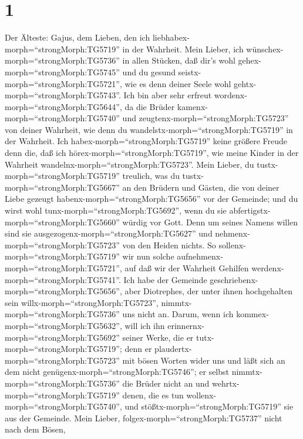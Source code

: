 \hypertarget{section}{%
\section{1}\label{section}}

 Der Älteste: Gajus, dem Lieben, den ich
liebhabex-morph=``strongMorph:TG5719'' in der Wahrheit. 
Mein Lieber, ich wünschex-morph=``strongMorph:TG5736'' in allen Stücken,
daß dir's wohl gehex-morph=``strongMorph:TG5745'' und du gesund
seistx-morph=``strongMorph:TG5721'', wie es denn deiner Seele wohl
gehtx-morph=``strongMorph:TG5743''.  Ich bin aber sehr
erfreut wordenx-morph=``strongMorph:TG5644'', da die Brüder
kamenx-morph=``strongMorph:TG5740'' und
zeugtenx-morph=``strongMorph:TG5723'' von deiner Wahrheit, wie denn du
wandelstx-morph=``strongMorph:TG5719'' in der Wahrheit.  Ich
habex-morph=``strongMorph:TG5719'' keine größere Freude denn die, daß
ich hörex-morph=``strongMorph:TG5719'', wie meine Kinder in der Wahrheit
wandelnx-morph=``strongMorph:TG5723''.  Mein Lieber, du
tustx-morph=``strongMorph:TG5719'' treulich, was du
tustx-morph=``strongMorph:TG5667'' an den Brüdern und Gästen,
 die von deiner Liebe gezeugt
habenx-morph=``strongMorph:TG5656'' vor der Gemeinde; und du wirst wohl
tunx-morph=``strongMorph:TG5692'', wenn du sie
abfertigstx-morph=``strongMorph:TG5660'' würdig vor Gott. 
Denn um seines Namens willen sind sie
ausgezogenx-morph=``strongMorph:TG5627'' und
nehmenx-morph=``strongMorph:TG5723'' von den Heiden nichts. 
So sollenx-morph=``strongMorph:TG5719'' wir nun solche
aufnehmenx-morph=``strongMorph:TG5721'', auf daß wir der Wahrheit
Gehilfen werdenx-morph=``strongMorph:TG5741''.  Ich habe der
Gemeinde geschriebenx-morph=``strongMorph:TG5656'', aber Diotrephes, der
unter ihnen hochgehalten sein willx-morph=``strongMorph:TG5723'',
nimmtx-morph=``strongMorph:TG5736'' uns nicht an.  Darum,
wenn ich kommex-morph=``strongMorph:TG5632'', will ich ihn
erinnernx-morph=``strongMorph:TG5692'' seiner Werke, die er
tutx-morph=``strongMorph:TG5719''; denn er
plaudertx-morph=``strongMorph:TG5723'' mit bösen Worten wider uns und
läßt sich an dem nicht genügenx-morph=``strongMorph:TG5746''; er selbst
nimmtx-morph=``strongMorph:TG5736'' die Brüder nicht an und
wehrtx-morph=``strongMorph:TG5719'' denen, die es tun
wollenx-morph=``strongMorph:TG5740'', und
stößtx-morph=``strongMorph:TG5719'' sie aus der Gemeinde. 
Mein Lieber, folgex-morph=``strongMorph:TG5737'' nicht nach dem Bösen,
